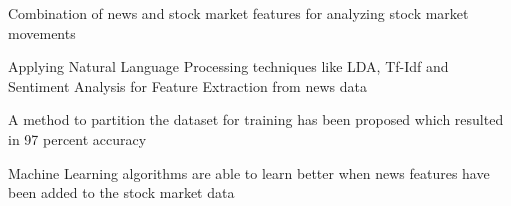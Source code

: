 \documentclass[12pt]{elsarticle}
\begin{document}
\begin{frontmatter}
\begin{highlights}

\item Combination of news and stock market features for analyzing stock market movements
\item Applying Natural Language Processing techniques like LDA, Tf-Idf and Sentiment Analysis for Feature Extraction from news data
\item A method to partition the dataset for training has been proposed which resulted in 97 percent accuracy
\item Machine Learning algorithms are able to learn better when news features have been added to the stock market data
\end{highlights}


\end{frontmatter}
\end{document}
